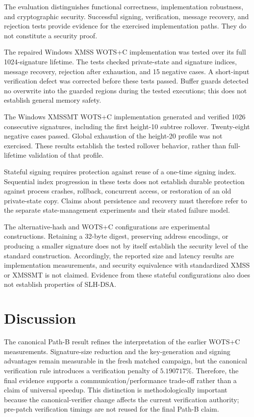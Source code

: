 \documentclass[pdflatex,sn-mathphys-num]{sn-jnl}
\begin{document}
The evaluation distinguishes functional correctness, implementation
robustness, and cryptographic security. Successful signing, verification,
message recovery, and rejection tests provide evidence for the exercised
implementation paths. They do not constitute a security proof.

The repaired Windows XMSS WOTS+C implementation was tested over its full
1024-signature lifetime. The tests checked private-state and signature indices,
message recovery, rejection after exhaustion, and 15 negative cases. A
short-input verification defect was corrected before these tests passed.
Buffer guards detected no overwrite into the guarded regions during the
tested executions; this does not establish general memory safety.

The Windows XMSSMT WOTS+C implementation generated and verified 1026
consecutive signatures, including the first height-10 subtree rollover.
Twenty-eight negative cases passed. Global exhaustion of the height-20
profile was not exercised. These results establish the tested rollover
behavior, rather than full-lifetime validation of that profile.

Stateful signing requires protection against reuse of a one-time signing
index. Sequential index progression in these tests does not establish
durable protection against process crashes, rollback, concurrent access,
or restoration of an old private-state copy. Claims about persistence and
recovery must therefore refer to the separate state-management experiments
and their stated failure model.

The alternative-hash and WOTS+C configurations are experimental
constructions. Retaining a 32-byte digest, preserving address encodings,
or producing a smaller signature does not by itself establish the security
level of the standard construction. Accordingly, the reported size and
latency results are implementation measurements, and security equivalence
with standardized XMSS or XMSSMT is not claimed. Evidence from these
stateful configurations also does not establish properties of SLH-DSA.

\section{Discussion}


The canonical Path-B result refines the interpretation of the
earlier WOTS+C measurements. Signature-size reduction and the
key-generation and signing advantages remain measurable in the
fresh matched campaign, but the canonical verification rule
introduces a verification penalty of $5.190717\%$. Therefore,
the final evidence supports a communication/performance
trade-off rather than a claim of universal speedup. This
distinction is methodologically important because the
canonical-verifier change affects the current verification
authority; pre-patch verification timings are not reused for
the final Path-B claim.
\end{document}
